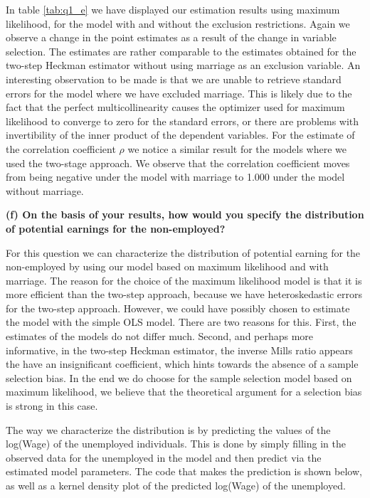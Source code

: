\documentclass[
]{article}
\begin{document}
In table \ref{tab:q1_e} we have displayed our estimation results using
maximum likelihood, for the model with and without the exclusion
restrictions. Again we observe a change in the point estimates as a
result of the change in variable selection. The estimates are rather
comparable to the estimates obtained for the two-step Heckman estimator
without using marriage as an exclusion variable. An interesting
observation to be made is that we are unable to retrieve standard errors
for the model where we have excluded marriage. This is likely due to the
fact that the perfect multicollinearity causes the optimizer used for
maximum likelihood to converge to zero for the standard errors, or there
are problems with invertibility of the inner product of the dependent
variables. For the estimate of the correlation coefficient \(\rho\) we
notice a similar result for the models where we used the two-stage
approach. We observe that the correlation coefficient moves from being
negative under the model with marriage to 1.000 under the model without
marriage.

\textbf{(f) On the basis of your results, how would you specify the
distribution of potential earnings for the non-employed?}

For this question we can characterize the distribution of potential
earning for the non-employed by using our model based on maximum
likelihood and with marriage. The reason for the choice of the maximum
likelihood model is that it is more efficient than the two-step
approach, because we have heteroskedastic errors for the two-step
approach. However, we could have possibly chosen to estimate the model
with the simple OLS model. There are two reasons for this. First, the
estimates of the models do not differ much. Second, and perhaps more
informative, in the two-step Heckman estimator, the inverse Mills ratio
appears the have an insignificant coefficient, which hints towards the
absence of a sample selection bias. In the end we do choose for the
sample selection model based on maximum likelihood, we believe that the
theoretical argument for a selection bias is strong in this case.

The way we characterize the distribution is by predicting the values of
the log(Wage) of the unemployed individuals. This is done by simply
filling in the observed data for the unemployed in the model and then
predict via the estimated model parameters. The code that makes the
prediction is shown below, as well as a kernel density plot of the
predicted log(Wage) of the unemployed.
\end{document}
